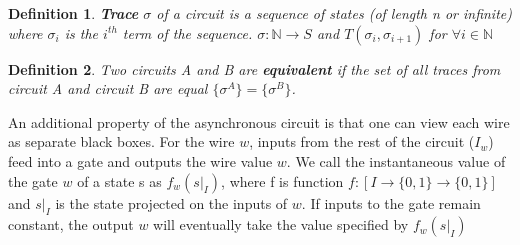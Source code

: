 \documentclass{article}
\newtheorem*{definition}{Definition}
\begin{document}
\begin{definition} \textbf{Trace} $\sigma$ of a circuit is a sequence of states (of length n or infinite) where $\sigma_i$ is the $i^{th}$ term of the sequence.  $\sigma: \mathbb{N} \to S$ and $T(\sigma_i,\sigma_{i+1})$ for $\forall i \in \mathbb{N}$\end{definition} 

\begin{definition} Two circuits A and B are \textbf{equivalent} if the set of all traces from circuit A and circuit B are equal $\{\sigma^A \}=\{\sigma^B \}$.
\end{definition}

An additional property of the asynchronous circuit is that one can view each wire as separate black boxes.  For the wire $w$, inputs from the rest of the circuit ($I_w$) feed into a gate and outputs the wire value $w$.  We call the instantaneous value of the gate $w$ of a state s as $f_w(s|_I)$, where f is function $f:[I \to \{0,1\} \to \{0,1\}]$ and $s|_I$ is the state projected on the inputs of $w$.  If inputs to the gate remain constant, the output $w$ will eventually take the value specified by $f_w(s|_I)$  %
\newline
\end{document}
